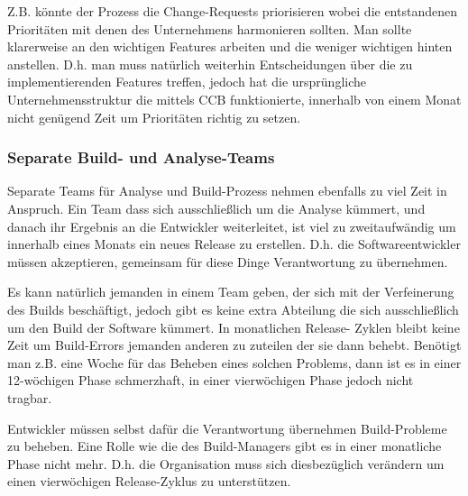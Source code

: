 Z.B. könnte der Prozess die Change-Requests priorisieren wobei die
entstandenen Prioritäten mit denen des Unternehmens harmonieren sollten. Man
sollte klarerweise an den wichtigen Features arbeiten und die weniger
wichtigen hinten anstellen. D.h. man muss natürlich weiterhin Entscheidungen
über die zu implementierenden Features treffen, jedoch hat die ursprüngliche
Unternehmensstruktur die mittels CCB funktionierte, innerhalb von einem Monat
nicht genügend Zeit um Prioritäten richtig zu setzen.

\subsubsection{Separate Build- und Analyse-Teams}
Separate Teams für Analyse und Build-Prozess nehmen ebenfalls zu viel Zeit in
Anspruch. Ein Team dass sich ausschließlich um die Analyse kümmert, und danach
ihr Ergebnis an die Entwickler weiterleitet, ist viel zu zweitaufwändig um
innerhalb eines Monats ein neues Release zu erstellen. D.h. die
Softwareentwickler müssen akzeptieren, gemeinsam für diese Dinge Verantwortung
zu übernehmen.

Es kann natürlich jemanden in einem Team geben, der sich mit der Verfeinerung
des Builds beschäftigt, jedoch gibt es keine extra Abteilung die sich
ausschließlich um den Build der Software kümmert. In monatlichen Release-
Zyklen bleibt keine Zeit um Build-Errors jemanden anderen zu zuteilen der sie
dann behebt. Benötigt man z.B. eine Woche für das Beheben eines solchen
Problems, dann ist es in einer 12-wöchigen Phase schmerzhaft, in einer
vierwöchigen Phase jedoch nicht tragbar.

Entwickler müssen selbst dafür die Verantwortung übernehmen Build-Probleme zu
beheben. Eine Rolle wie die des Build-Managers gibt es in einer monatliche
Phase nicht mehr. D.h. die Organisation muss sich diesbezüglich verändern um
einen vierwöchigen Release-Zyklus zu unterstützen.
